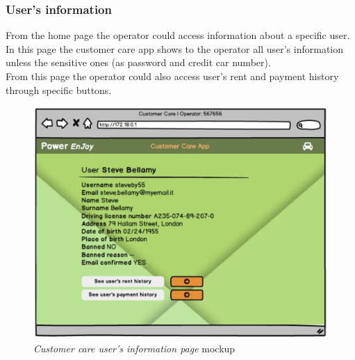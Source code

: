 \clearpage 
		
\subsubsection{User's information} \label{sec:userInfoCc}

From the home page the operator could access information about a specific user. In this page the customer care app shows to the operator all user's information unless the sensitive ones (as password and credit car number). \\

From this page the operator could also access user's rent and payment history through specific buttons.

\begin{figure}[h]
			\centering
			\includegraphics[width=0.895\linewidth]{mockups/customerCare2}
			\caption{
				\label{fig:cc2} 
				\emph{Customer care user's information page} mockup
			}
		\end{figure}